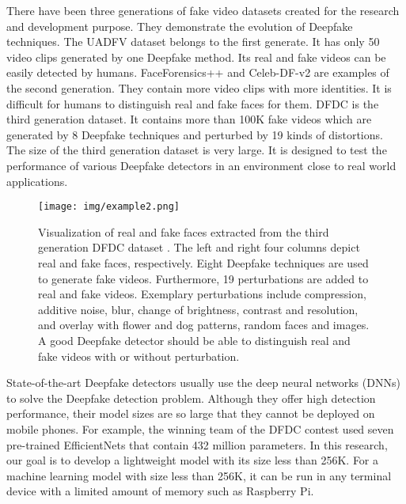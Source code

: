 \documentclass[main, biber]{now-journal}
\begin{document}
There have been three generations of fake video datasets created for the
research and development purpose. They demonstrate the evolution of
Deepfake techniques. The UADFV dataset \citep{li2018exposing} belongs to
the first generate. It has only 50 video clips generated by one Deepfake
method. Its real and fake videos can be easily detected by humans.
FaceForensics++ \citep{rossler2019faceforensics++} and Celeb-DF-v2
\citep{li2020celeb} are examples of the second generation. They contain
more video clips with more identities. It is difficult for humans to
distinguish real and fake faces for them.  DFDC
\citep{dolhansky2020deepfake} is the third generation dataset. It
contains more than 100K fake videos which are generated by 8 Deepfake
techniques and perturbed by 19 kinds of distortions. The size of the
third generation dataset is very large. It is designed to test the
performance of various Deepfake detectors in an environment close to
real world applications. 

\begin{figure*}[!t]
\centering
\texttt{[image: img/example2.png]}
\caption{Visualization of real and fake faces extracted from the third
generation DFDC dataset \citep{dolhansky2020deepfake}. The left and
right four columns depict real and fake faces, respectively.  Eight
Deepfake techniques are used to generate fake videos. Furthermore, 19
perturbations are added to real and fake videos.  Exemplary
perturbations include compression, additive noise, blur, change of
brightness, contrast and resolution, and overlay with flower and dog
patterns, random faces and images. A good Deepfake detector should be
able to distinguish real and fake videos with or without perturbation.}
\label{fig_exam}
\end{figure*}

State-of-the-art Deepfake detectors usually use the deep neural networks
(DNNs) to solve the Deepfake detection problem. Although they offer high
detection performance, their model sizes are so large that they cannot
be deployed on mobile phones. For example, the winning team of the DFDC
contest \citep{seferbekov2020dfdc} used seven pre-trained EfficientNets
that contain 432 million parameters.  In this research, our goal is to
develop a lightweight model with its size less than 256K. For a machine
learning model with size less than 256K, it can be run in any terminal
device with a limited amount of memory such as Raspberry Pi. 
\end{document}
